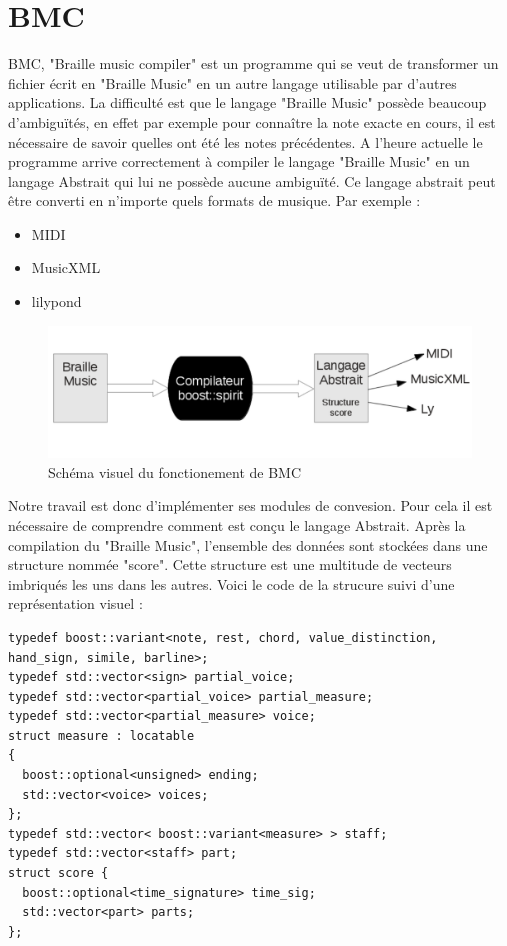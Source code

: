 \section{BMC}

BMC, "Braille music compiler" est un programme qui se veut de transformer un fichier écrit en "Braille Music" en un autre langage utilisable par d'autres applications. La difficulté est que le langage "Braille Music" possède beaucoup d'ambiguïtés, en effet par exemple pour connaître la note exacte en cours, il est nécessaire de savoir quelles ont été les notes précédentes. A l'heure actuelle le programme arrive correctement à compiler le langage "Braille Music" en un langage Abstrait qui lui ne possède aucune ambiguïté. Ce langage abstrait peut être converti en n'importe quels formats de musique. Par exemple : 
\begin{itemize}
\item MIDI
\item MusicXML
\item lilypond
\end{itemize}
\begin{figure}[!h]
  \centering
  \includegraphics[scale=0.4]{images/fonction-bmc.png}
  \caption{Schéma visuel du fonctionement de BMC}
  
\end{figure}

Notre travail est donc d'implémenter ses modules de convesion. Pour cela il est nécessaire de comprendre comment est conçu le langage Abstrait. Après la compilation du "Braille Music", l'ensemble des données sont stockées dans une structure nommée "score". Cette structure est une multitude de vecteurs imbriqués les uns dans les autres. Voici le code de la strucure suivi d'une représentation visuel :

\begin{verbatim}
typedef boost::variant<note, rest, chord, value_distinction, hand_sign, simile, barline>;
typedef std::vector<sign> partial_voice;
typedef std::vector<partial_voice> partial_measure;
typedef std::vector<partial_measure> voice;
struct measure : locatable
{
  boost::optional<unsigned> ending;
  std::vector<voice> voices;
};
typedef std::vector< boost::variant<measure> > staff;
typedef std::vector<staff> part;
struct score {
  boost::optional<time_signature> time_sig;
  std::vector<part> parts;
};
\end{verbatim}

